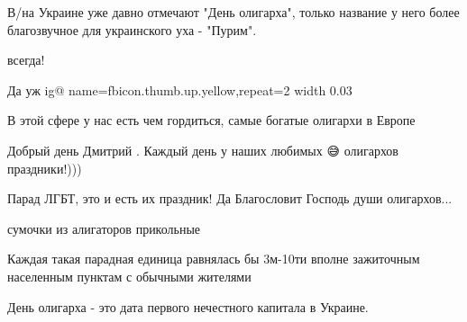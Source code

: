 \begin{itemize}
В/на Украине уже давно отмечают "День олигарха", только название у него более благозвучное для украинского уха - "Пурим".

 
всегда!

 
Да уж
\ifcmt
  ig@ name=fbicon.thumb.up.yellow,repeat=2
  width 0.03
\fi

В этой сфере у нас есть чем гордиться, самые богатые олигархи в Европе 🎉🎉🎉

 
Добрый день Дмитрий \Laughey[1.0][white]. Каждый день у наших любимых 😅 олигархов праздники!)))

 
Парад ЛГБТ, это и есть их праздник! Да Благословит Господь души олигархов...

 
сумочки из алигаторов прикольные

 
Каждая такая парадная единица равнялась бы 3м-10ти вполне зажиточным населенным пунктам с обычными жителями

 
День олигарха - это дата первого нечестного капитала в Украине.

\end{itemize}

